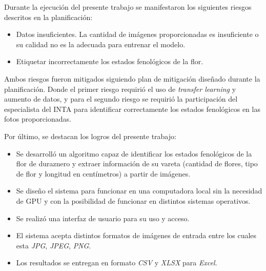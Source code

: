 Durante la ejecución del presente trabajo se manifestaron los siguientes riesgos descritos en la planificación:

\begin{itemize}
\item Datos insuficientes. La cantidad de imágenes proporcionadas es insuficiente o su calidad no es la adecuada para entrenar el modelo.
\item Etiquetar incorrectamente los estados fenológicos de la flor. 
\end{itemize}

Ambos riesgos fueron mitigados siguiendo plan de mitigación diseñado durante la planificación. Donde el primer riesgo requirió el uso de \textit{transfer learning} y aumento de datos, y para el segundo riesgo se requirió la participación del especialista del INTA para identificar correctamente los estados fenológicos en las fotos proporcionadas.

Por último, se destacan los logros del presente trabajo:

\begin{itemize}
\item Se desarrolló un algoritmo capaz de identificar los estados fenológicos de la flor de duraznero y extraer información de su vareta (cantidad de flores, tipo de flor y longitud en centímetros) a partir de imágenes.
\item Se diseño el sistema para funcionar en una computadora local sin la necesidad de GPU y con la posibilidad de funcionar en distintos sistemas operativos.
\item Se realizó una interfaz de usuario para su uso y acceso.
\item El sistema acepta distintos formatos de imágenes de entrada entre los cuales esta \textit{JPG}, \textit{JPEG}, \textit{PNG}.
\item Los resultados se entregan en formato \textit{CSV} y \textit{XLSX} para \textit{Excel}.
\end{itemize} 

%
%


